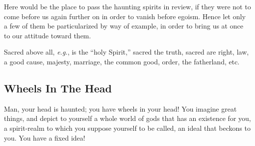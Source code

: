 Here would be the place to pass the haunting spirits in review, if they were 
not to come before us again further on in order to vanish before egoism. Hence 
let only a few of them be particularized by way of example, in order to bring 
us at once to our attitude toward them.

Sacred above all, \textit{e.g.}, is the ``holy Spirit,'' sacred the truth, 
sacred are right, law, a good cause, majesty, marriage, the common good, 
order, the fatherland, etc.

\subsection[Wheels In The Head]{\centering Wheels In The Head}

Man, your head is haunted; you have wheels in your head! You imagine great 
things, and depict to yourself a whole world of gods that has an existence for 
you, a spirit-realm to which you suppose yourself to be called, an ideal that 
beckons to you. You have a fixed idea!

